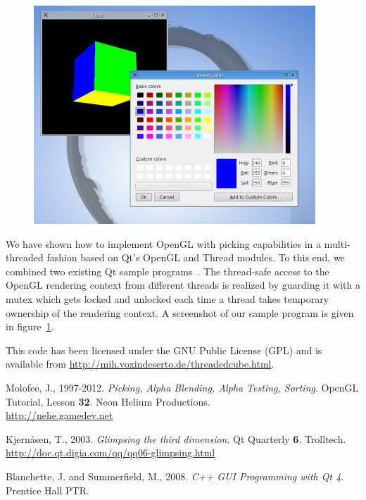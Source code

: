 \documentclass[jou,noapacite]{apa}
\begin{document}
\begin{figure}[bp]
\begin{center}
  \includegraphics[width=.95\linewidth  %
  ]
  {threadedcube_screenshot.png}
  \label{fig:screenshot}
\end{center}
\end{figure}

We have shown how to implement OpenGL with picking capabilities in a multi-threaded fashion
based on Qt's OpenGL and Thread modules.
%
To this end, we combined two existing Qt sample
programs~\cite{glimpse3d,Blanchette2008}.
%
The thread-safe access to the OpenGL rendering context from different threads
is realized by guarding it with a mutex which gets locked and unlocked each
time a thread takes temporary ownership of the rendering context.
%
A screenshot of our sample program is given in figure~\ref{fig:screenshot}.
%


This code has been licensed under the GNU Public License (GPL) and is available
from \url{http://mih.voxindeserto.de/threadedcube.html}.





\begin{thebibliography}{10}


  Molofee, J., 1997-2012. {\itshape Picking, Alpha Blending, Alpha Testing, Sorting}. OpenGL Tutorial, Lesson {\bf 32}. Neon Helium Productions. \\\url{http://nehe.gamedev.net}

Kjern\r{a}sen, T., 2003. {\itshape Glimpsing the third dimension}. Qt Quarterly {\bf 6}. Trolltech.
\url{http://doc.qt.digia.com/qq/qq06-glimpsing.html}

Blanchette, J. and Summerfield, M., 2008. {\itshape C++ GUI Programming with Qt
  4}.   Prentice Hall PTR.
\end{thebibliography}
\end{document}
